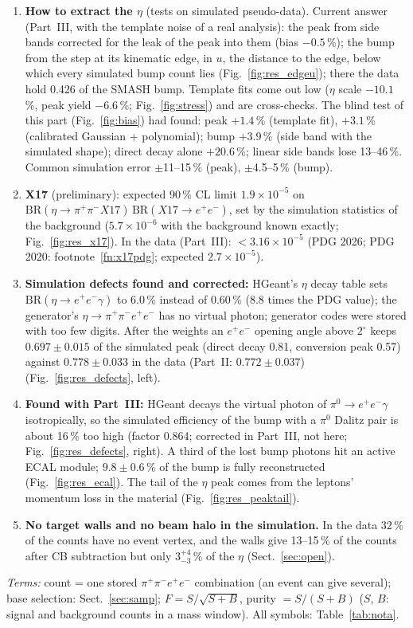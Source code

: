 \documentclass[11pt,a4paper]{article}
\newcommand{\pip}{\ensuremath{\pi^{+}}\xspace}
\newcommand{\pim}{\ensuremath{\pi^{-}}\xspace}
\newcommand{\piz}{\ensuremath{\pi^{0}}\xspace}
\newcommand{\ee}{\ensuremath{e^{+}e^{-}}\xspace}
\newcommand{\pipi}{\ensuremath{\pi^{+}\pi^{-}}\xspace}
\newcommand{\ppee}{\ensuremath{\pi^{+}\pi^{-}e^{+}e^{-}}\xspace}
\begin{document}
{\begin{enumerate}
\item \textbf{How to extract the $\eta$} (tests on simulated pseudo-data). Current answer (Part~III, with the template noise
      of a real analysis): the peak from side bands corrected for the leak of the peak into them (bias $-0.5$\,\%); the bump
      from the step at its kinematic edge, in $u$, the distance to the edge, below which every simulated bump count lies
      (Fig.~\ref{fig:res_edgeu}); there the data hold 0.426 of the SMASH bump. Template fits come out low ($\eta$ scale
      $-10.1$\,\%, peak yield $-6.6$\,\%; Fig.~\ref{fig:stress}) and are cross-checks. The blind test of this part
      (Fig.~\ref{fig:bias}) had found: peak $+1.4$\,\% (template fit), $+3.1$\,\% (calibrated Gaussian + polynomial); bump
      $+3.9$\,\% (side band with the simulated shape); direct decay alone $+20.6$\,\%; linear side bands lose 13--46\,\%.
      Common simulation error $\pm$11--15\,\% (peak), $\pm$4.5--5\,\% (bump).
\item \textbf{X17} (preliminary): expected 90\,\% CL limit $1.9\times10^{-5}$ on $\mathrm{BR}(\eta\to\pipi X17)\,
      \mathrm{BR}(X17\to\ee)$, set by the simulation statistics of the background ($5.7\times10^{-6}$ with the background known
      exactly; Fig.~\ref{fig:res_x17}). In the data (Part~III): $<3.16\times10^{-5}$ (PDG 2026; PDG 2020:
      footnote~\ref{fn:x17pdg}; expected $2.7\times10^{-5}$).
\item \textbf{Simulation defects found and corrected:} HGeant's $\eta$ decay table sets $\mathrm{BR}(\eta\to\ee\gamma)$ to
      6.0\,\% instead of 0.60\,\% (8.8 times the PDG value); the generator's $\eta\to\ppee$ has no virtual photon; generator
      codes were stored with too few digits. After the weights an \ee opening angle above $2^\circ$ keeps $0.697\pm0.015$ of
      the simulated peak (direct decay 0.81, conversion peak 0.57) against $0.778\pm0.033$ in the data (Part~II:
      $0.772\pm0.037$) (Fig.~\ref{fig:res_defects}, left).
\item \textbf{Found with Part~III:} HGeant decays the virtual photon of $\piz\to\ee\gamma$ isotropically, so the simulated
      efficiency of the bump with a \piz Dalitz pair is about 16\,\% too high (factor 0.864; corrected in Part~III, not here;
      Fig.~\ref{fig:res_defects}, right). A third of the lost bump photons hit an active ECAL module; $9.8\pm0.6$\,\% of the
      bump is fully reconstructed (Fig.~\ref{fig:res_ecal}). The tail of the $\eta$ peak comes from the leptons' momentum loss
      in the material (Fig.~\ref{fig:res_peaktail}).
\item \textbf{No target walls and no beam halo in the simulation.} In the data 32\,\% of the counts have no event vertex,
      and the walls give 13--15\,\% of the counts after CB subtraction but only $3^{+4}_{-3}$\,\% of the $\eta$
      (Sect.~\ref{sec:open}).
\end{enumerate}
{\footnotesize\textit{Terms:} count = one stored \pip\pim$e^+e^-$ combination (an event can give several); base
selection: Sect.~\ref{sec:samp}; $F = S/\sqrt{S+B}$, purity $= S/(S+B)$ ($S$, $B$: signal and background counts in a mass
window). All symbols: Table~\ref{tab:nota}.\par}}
\end{document}

